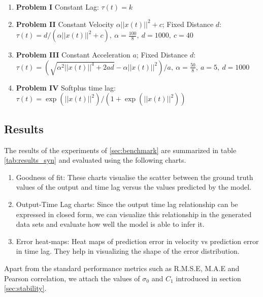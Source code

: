 \documentclass[envcountsect,runningheads]{llncs}
\theoremstyle{etoile}
\begin{document}
\begin{enumerate}
\item \textbf{Problem I} Constant Lag: \newline 
$\tau(t) = k$

\item \textbf{Problem II} Constant Velocity $\alpha ||x(t)||^2 + c$; Fixed Distance $d$: 
\newline $\tau(t) = d/(\alpha ||x(t)||^2 + c),\ \alpha = \frac{100}{8},\ d = 1000,\ c = 40$

\item \textbf{Problem III} Constant Acceleration $a$; Fixed Distance $d$: 
\newline $\tau(t) = (\sqrt{\alpha^2||x(t)||^4 + 2ad} - \alpha||x(t)||^2)/a,\ \alpha = \frac{50}{8},\ a = 5,\ d = 1000$

\item \textbf{Problem IV} Softplus time lag: 
\newline $\tau(t) = \exp\left(||x(t)||^2\right)/\left(1 + \exp(||x(t)||^2)\right)$

\end{enumerate}



\subsection{Results}

The results of the experiments of \ref{sec:benchmark} are summarized in table \ref{tab:results_syn} 
and evaluated using the following charts.

\begin{enumerate}
    \item Goodness of fit: These charts visualise the scatter between the ground truth values of the output
          and time lag versus the values predicted by the model. 
    \item Output-Time Lag charts: Since the output time lag relationship can be expressed in closed 
          form, we can visualize this relationship in the generated data sets and evaluate how well 
          the model is able to infer it.
    \item Error heat-maps: Heat maps of prediction error in velocity vs prediction error 
          in time lag. They help in visualizing the shape of the error distribution.
\end{enumerate}

Apart from the standard performance metrics such as R.M.S.E, M.A.E and Pearson correlation,
we attach the values of $\sigma_0$ and $C_1$ introduced in section \ref{sec:stability}.
\end{document}
